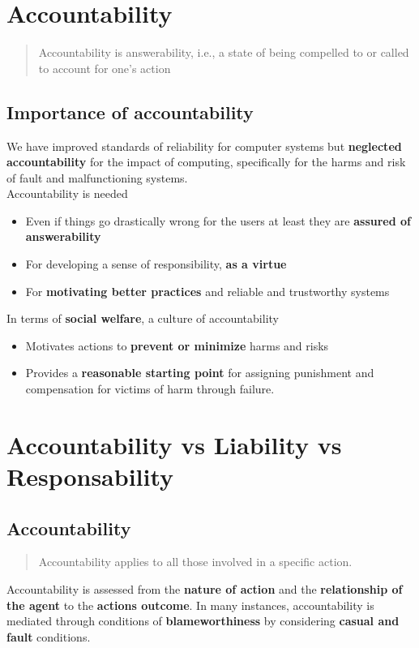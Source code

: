 \documentclass{article}
\begin{document}
\tableofcontents

\newpage

\section{Accountability}
\begin{quotation}
Accountability is answerability, i.e., a state of being compelled to or called to account for one’s action
\end{quotation}

\subsection{Importance of accountability}
\begin{flushleft}
We have improved standards of reliability for computer systems but \textbf{neglected accountability} for the impact of computing, specifically for the harms and risk of fault and malfunctioning systems. \\
Accountability is needed
\begin{itemize} 
  \item Even if things go drastically wrong for the users at least they are \textbf{assured of answerability}
  \item For developing a sense of responsibility, \textbf{as a virtue}
  \item For \textbf{motivating better practices} and reliable and trustworthy systems
\end{itemize}
In terms of \textbf{social welfare}, a culture of accountability
\begin{itemize}
  \item Motivates actions to \textbf{prevent or minimize} harms and risks
  \item Provides a \textbf{reasonable starting point} for assigning punishment and compensation for victims of harm through failure.
\end{itemize}
\end{flushleft}

\section{Accountability vs Liability vs Responsability}

\subsection{Accountability}
\begin{quote}
Accountability applies to all those involved in a specific action.
\end{quote}
\begin{flushleft}
Accountability is assessed from the \textbf{nature of action} and the \textbf{relationship of the agent} to the \textbf{actions outcome}. In many instances, accountability is mediated through conditions of \textbf{blameworthiness} by considering \textbf{casual and fault} conditions.
\end{flushleft}
\end{document}
